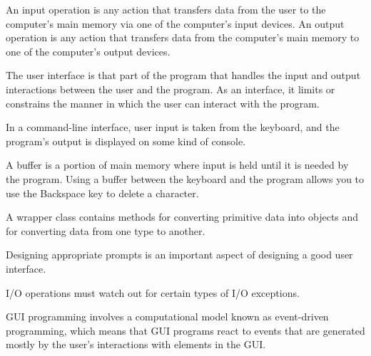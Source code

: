 
\begin{SMBL}

\vspace*{6pt}
\item An input operation is any action that transfers data from the
user to the computer's main memory via one of the computer's input
devices. An output operation is any action that transfers data
from the computer's main memory to one of the computer's output
devices. 

\vspace*{6pt}
\item The user interface is that part of the program that handles the
input and output interactions between the user and the program.  As an
interface, it limits or constrains the manner in which the user can
interact with the program.

\vspace*{6pt}
\item In a command-line interface, user input is taken from the
keyboard, and the program's output is displayed on some kind of
console. 

\vspace*{6pt}
\item A buffer is a portion of main memory where input is held until
it is needed by the program. Using a buffer between the keyboard and
the program allows you to use the Backspace key to delete a
character. 

\vspace*{6pt}
\item A wrapper class contains methods for converting primitive
data into objects and for converting data from one type to another.

\vspace*{6pt}
\item Designing appropriate prompts is an important aspect of
designing a good user interface.

\vspace*{6pt}
\item I/O operations must watch out for certain types of I/O
exceptions.

\vspace*{6pt}
\item GUI programming involves a computational model known as 
event-driven programming, which means that GUI programs react to
events that are generated mostly by the user's interactions with
elements in the GUI.


\end{SMBL}
